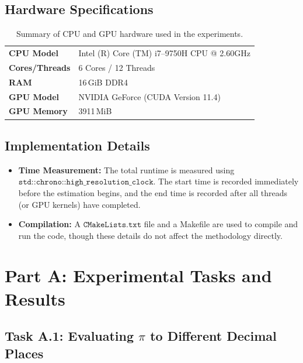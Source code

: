 \documentclass[12pt]{article}
\begin{document}
\subsection{Hardware Specifications}
\begin{table}[h]
      \centering
      \begin{tabular}{ll}
            \toprule
            \textbf{CPU Model}     & Intel (R) Core (TM) i7--9750H CPU @ 2.60GHz \\
            \textbf{Cores/Threads} & 6 Cores / 12 Threads                        \\
            \textbf{RAM}           & 16\,GiB DDR4                                \\
            \midrule
            \textbf{GPU Model}     & NVIDIA GeForce (CUDA Version 11.4)          \\
            \textbf{GPU Memory}    & 3911\,MiB                                   \\
            \bottomrule
      \end{tabular}
      \caption{Summary of CPU and GPU hardware used in the experiments.}\label{tab:hardware}
\end{table}

\subsection{Implementation Details}
\begin{itemize}
      \item \textbf{Time Measurement:} The total runtime is measured using
            \(\texttt{std::chrono::high\_resolution\_clock}\). The start time is recorded
            immediately before the estimation begins, and the end time is recorded after
            all threads (or GPU kernels) have completed.
      \item \textbf{Compilation:} A \(\texttt{CMakeLists.txt}\) file and a Makefile are used
            to compile and run the code, though these details do not affect the methodology
            directly.
\end{itemize}

\section{Part A\texorpdfstring{\@:}{:} Experimental Tasks and Results}

\subsection{Task A.1: Evaluating \texorpdfstring{\(\pi\)}{pi} to Different Decimal Places}
\end{document}
